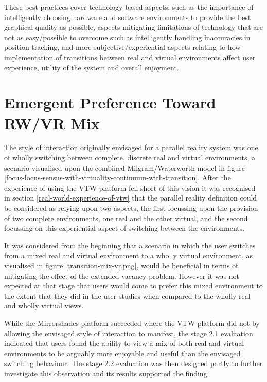 These best practices cover technology based aspects, such as the importance of intelligently choosing hardware and software environments to provide the best graphical quality as possible, aspects mitigating limitations of technology that are not as easy/possible to overcome such as intelligently handling inaccuracies in position tracking, and more subjective/experiential aspects relating to how implementation of transitions between real and virtual environments affect user experience, utility of the system and overall enjoyment.


\section{Emergent Preference Toward RW/VR Mix}

The style of interaction originally envisaged for a parallel reality system was one of wholly switching between complete, discrete real and virtual environments, a scenario visualised upon the combined Milgram/Waterworth model in figure \ref{focus-locus-sensus-with-virtuality-continuum-with-transition}. After the experience of using the VTW platform fell short of this vision it was recognised in section \ref{real-world-experience-of-vtw} that the parallel reality definition could be considered as relying upon two aspects, the first focussing upon the provision of two complete environments, one real and the other virtual, and the second focussing on this experiential aspect of switching between the environments.

It was considered from the beginning that a scenario in which the user switches from a mixed real and virtual environment to a wholly virtual environment, as visualised in figure \ref{transition-mix-vr.png}, would be beneficial in terms of mitigating the effect of the extended vacancy problem. However it was not expected at that stage that users would come to prefer this mixed environment to the extent that they did in the user studies when compared to the wholly real and wholly virtual views.

While the Mirrorshades platform succeeded where the VTW platform did not by allowing the envisaged style of interaction to manifest, the stage 2.1 evaluation indicated that users found the ability to view a mix of both real and virtual environments to be arguably more enjoyable and useful than the envisaged switching behaviour. The stage 2.2 evaluation was then designed partly to further investigate this observation and its results supported the finding.

